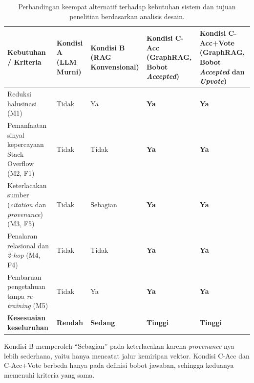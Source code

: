 \begin{table}[!htbp]
\centering
\caption{Perbandingan keempat alternatif terhadap kebutuhan sistem dan tujuan penelitian berdasarkan analisis desain.}
\label{tab:komparasi-solusi}

\small
\renewcommand{\arraystretch}{1.3}

\begin{tabularx}{\textwidth}{|
>{\raggedright\arraybackslash}X|
>{\centering\arraybackslash}p{1.9cm}|
>{\centering\arraybackslash}p{2.1cm}|
>{\centering\arraybackslash}p{2.1cm}|
>{\centering\arraybackslash}p{2.3cm}|}
\hline

\textbf{Kebutuhan / Kriteria}
& \textbf{Kondisi A} \newline (LLM Murni)
& \textbf{Kondisi B} \newline (RAG Konvensional)
& \textbf{Kondisi C-Acc} \newline (GraphRAG, Bobot \emph{Accepted})
& \textbf{Kondisi C-Acc+Vote} \newline (GraphRAG, Bobot \emph{Accepted} dan \emph{Upvote})
\\
\hline

Reduksi halusinasi (M1)
& Tidak & Ya & \textbf{Ya} & \textbf{Ya} \\
\hline

Pemanfaatan sinyal kepercayaan Stack Overflow (M2, F1)
& Tidak & Tidak & \textbf{Ya} & \textbf{Ya} \\
\hline

Keterlacakan sumber (\emph{citation} dan \emph{provenance}) (M3, F5)
& Tidak & Sebagian & \textbf{Ya} & \textbf{Ya} \\
\hline

Penalaran relasional dan \emph{2-hop} (M4, F4)
& Tidak & Tidak & \textbf{Ya} & \textbf{Ya} \\
\hline

Pembaruan pengetahuan tanpa \emph{re-training} (M5)
& Tidak & Ya & \textbf{Ya} & \textbf{Ya} \\
\hline

\textbf{Kesesuaian keseluruhan}
& \textbf{Rendah} & \textbf{Sedang} & \textbf{Tinggi} & \textbf{Tinggi} \\
\hline

\end{tabularx}

\vspace{0.1cm}
\raggedright\footnotesize
Kondisi B memperoleh ``Sebagian'' pada keterlacakan karena \emph{provenance}-nya lebih sederhana, yaitu hanya mencatat jalur kemiripan vektor. Kondisi C-Acc dan C-Acc+Vote berbeda hanya pada definisi bobot jawaban, sehingga keduanya memenuhi kriteria yang sama.
\end{table}